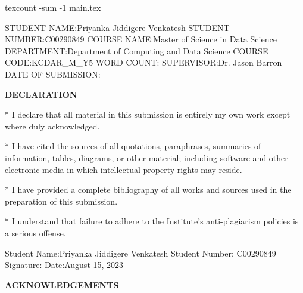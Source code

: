 \documentclass[12pt]{article}
\title{
\vskip Predicting the success rate of startups in India and their ability to survive a global crisis using machine learning
\texttt{[image: Figures/SETU\_Final.png]} 
}
\author{}
\date{}
\begin{document}
\bash
texcount -sum -1 main.tex 
\END 

\maketitle  
\begin{center}
    \begin{flushleft}
    STUDENT NAME:\space Priyanka Jiddigere Venkatesh
    \bigbreak
    STUDENT NUMBER:\space C00290849
    \bigbreak
    COURSE NAME:\space Master of Science in Data Science
    \bigbreak
    DEPARTMENT:\space Department of Computing and Data Science
    \bigbreak
    COURSE CODE:\space KCDAR\_M\_Y5
    \bigbreak
     WORD COUNT:\space \emph{\bashStdout}
    \bigbreak
    SUPERVISOR:\space Dr. Jason Barron
    \bigbreak
    DATE OF SUBMISSION:\space \date{\today}
    \end{flushleft}
\end{center}  



\newpage
\vfill\noindent
\begin{center}
  \textbf{DECLARATION}
\end{center}

* I declare that all material in this submission is entirely my own work except where duly acknowledged.

* I have cited the sources of all quotations, paraphrases, summaries of information, tables, diagrams, or other material; including software and other electronic media in which intellectual property rights may reside.

* I have provided a complete bibliography of all works and sources used in the preparation of this submission.

* I understand that failure to adhere to the Institute's anti-plagiarism policies is a serious offense.

\vspace*{20em}\noindent


Student Name:\space\space\space\space Priyanka Jiddigere Venkatesh
\bigbreak
Student Number: C00290849
\bigbreak
Signature:
\bigbreak
Date:\space\space\space\space\space\space\space\space\space\space\space\space\space\space\space August 15, 2023

\vspace*{4em}\noindent

\newpage
\begin{center}
  \textbf{ACKNOWLEDGEMENTS}
\end{center}
\end{document}
